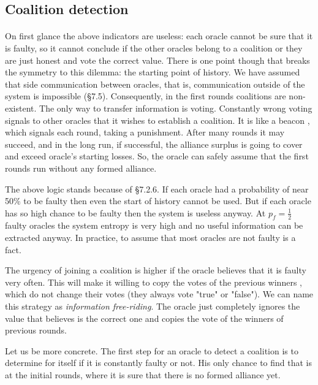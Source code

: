 \documentclass{article}
\begin{document}
\subsection{Coalition detection}
\paragraph{ }
On first glance the above indicators are useless: each oracle cannot be sure that it is faulty, so it cannot conclude if the other oracles belong to a coalition or they are just honest and vote the correct value. There is one point though that breaks the symmetry to this dilemma: the starting point of history. We have assumed that side communication between oracles, that is, communication outside of the system is impossible (§7.5). Consequently, in the first rounds coalitions are non-existent. The only way to transfer information is voting. Constantly wrong voting signals to other oracles that it wishes to establish a coalition. It is like a beacon , which signals each round, taking a punishment. After many rounds it may succeed, and in the long run, if successful, the alliance surplus is going to cover and exceed oracle's starting losses. So, the oracle can safely assume that the first rounds run without any formed alliance.
\par The above logic stands because of §7.2.6. If each oracle had a probability of near 50\% to be faulty then even the start of history cannot be used. But if each oracle has so high chance to be faulty then the system is useless anyway. At $p_f=\frac{1}{2} $~ 
faulty oracles the system entropy is very high and no useful information can be extracted anyway. In practice, to assume that most oracles are not faulty is a fact.
\par The urgency of joining a coalition is higher if the oracle believes that it is faulty very often. This will make it willing to copy the votes of the previous winners , which do not change their votes (they always vote "true" or "false"). We can name this strategy as \emph{information free-riding}. The oracle just completely ignores the value that believes is the correct one and copies the vote of the winners of previous rounds.
\par Let us be more concrete. The first step for an oracle to detect a coalition is to determine for itself if it is constantly faulty or not. His only chance to find that is at the initial rounds, where it is sure that there is no formed alliance yet.
\end{document}
